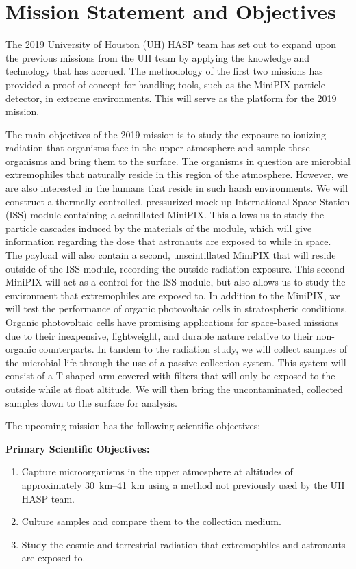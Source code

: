 \section{Mission Statement and Objectives}
\label{sec:Introduction}


The 2019 University of Houston (UH) HASP team has set out to expand upon the previous missions \cite{SORA1}\cite{SORA2} from the UH team by applying the knowledge and technology that has accrued.
The methodology of the first two missions has provided a proof of concept for handling tools, such as the MiniPIX particle detector,  in extreme environments.
This will serve as the platform for the 2019 mission.

The main objectives of the 2019 mission is to study the exposure to ionizing radiation that organisms face in the upper atmosphere and sample these organisms and bring them to the surface.
The organisms in question are microbial extremophiles that naturally reside in this region of the atmosphere.
However, we are also interested in the humans that reside in such harsh environments.
We will construct a thermally-controlled, pressurized mock-up International Space Station (ISS) module containing a scintillated MiniPIX.
This allows us to study the particle cascades induced by the materials of the module, which will give information regarding the dose that astronauts are exposed to while in space.
The payload will also contain a second, unscintillated MiniPIX that will reside outside of the ISS module, recording the outside radiation exposure.
This second MiniPIX will act as a control for the ISS module, but also allows us to study the environment that extremophiles are exposed to.
In addition to the MiniPIX, we will test the performance of organic photovoltaic cells in stratospheric conditions.
Organic photovoltaic cells have promising applications for space-based missions due to their inexpensive, lightweight, and durable nature relative to their non-organic counterparts.
In tandem to the radiation study, we will collect samples of the microbial life through the use of a passive collection system.
This system will consist of a T-shaped arm covered with filters that will only be exposed to the outside while at float altitude.
We will then bring the uncontaminated, collected samples down to the surface for analysis.

\noindent The upcoming mission has the following scientific objectives:

\noindent \textbf {Primary Scientific Objectives:}
\begin{enumerate}
\item Capture microorganisms in the upper atmosphere at altitudes of approximately \SIrange{30}{41}{\kilo\meter} using a method not previously used by the UH HASP team. 
\item Culture samples and compare them to the collection medium.
\item Study the cosmic and terrestrial radiation that extremophiles and astronauts are exposed to.
\end{enumerate}

